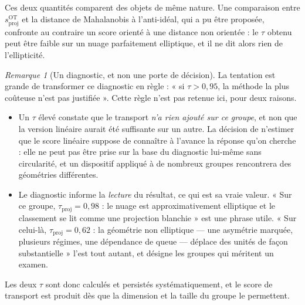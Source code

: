 \documentclass[11pt,a4paper]{article}
\theoremstyle{definition}
\theoremstyle{remark}
\newtheorem{remarque}{Remarque}[section]
\begin{document}
\bigskip

Ces deux quantités comparent des objets de même nature. Une comparaison entre
$s^{\mathrm{OT}}_{\mathrm{proj}}$ et la distance de Mahalanobis à l'anti-idéal, qui a pu
être proposée, confronte au contraire un score orienté à une distance non orientée : le
$\tau$ obtenu peut être faible sur un nuage parfaitement elliptique, et il ne dit alors rien
de l'ellipticité.

\medskip

\begin{remarque}[Un diagnostic, et non une porte de décision]
  \label{rem:ot-diagnostic}
  La tentation est grande de transformer ce diagnostic en règle : « si $\tau > 0{,}95$, la
  méthode la plus coûteuse n'est pas justifiée ». Cette règle n'est pas retenue ici, pour
  deux raisons.

  \medskip

  \begin{itemize}[nosep,leftmargin=1.4em]
    \item Un $\tau$ élevé constate que le transport \emph{n'a rien ajouté sur ce groupe},
    et non que la version linéaire aurait été suffisante sur un autre. La décision de
    n'estimer que le score linéaire suppose de connaître à l'avance la réponse qu'on
    cherche : elle ne peut pas être prise sur la base du diagnostic lui-même sans
    circularité, et un dispositif appliqué à de nombreux groupes rencontrera des géométries
    différentes.
    \item Le diagnostic informe la \emph{lecture} du résultat, ce qui est sa vraie valeur.
    « Sur ce groupe, $\tau_{\mathrm{proj}} = 0{,}98$ : le nuage est approximativement
    elliptique et le classement se lit comme une projection blanchie » est une phrase utile.
    « Sur celui-là, $\tau_{\mathrm{proj}} = 0{,}62$ : la géométrie non elliptique --- une
    asymétrie marquée, plusieurs régimes, une dépendance de queue --- déplace des unités de
    façon substantielle » l'est tout autant, et désigne les groupes qui méritent un examen.
  \end{itemize}

  \medskip

  Les deux $\tau$ sont donc calculés et persistés systématiquement, et le score de transport
  est produit dès que la dimension et la taille du groupe le permettent.
\end{remarque}

\bigskip
\end{document}
